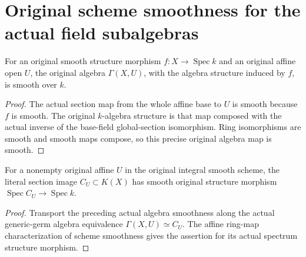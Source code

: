 \section{Original scheme smoothness for the actual field subalgebras}

\begin{theorem}\label{thm:sc0-smooth-original-affine-sections}
\leanok
For an original smooth structure morphism $f:X\to\operatorname{Spec} k$
and an original affine open $U$, the original algebra
$\Gamma(X,U)$, with the algebra structure induced by $f$, is smooth over $k$.
\end{theorem}
\begin{proof}
The actual section map from the whole affine base to $U$ is smooth
because $f$ is smooth. The original $k$-algebra structure is that
map composed with the actual inverse of the base-field global-section
isomorphism. Ring isomorphisms are smooth and smooth maps compose,
so this precise original algebra map is smooth.
\end{proof}

\begin{theorem}\label{thm:sc0-smooth-original-field-subalgebra}
\leanok
{}
For a nonempty original affine $U$ in the original integral smooth
scheme, the literal section image $C_U\subset K(X)$ has smooth
original structure morphism $\operatorname{Spec} C_U\to\operatorname{Spec} k$.
\end{theorem}
\begin{proof}
Transport the preceding actual algebra smoothness along the actual
generic-germ algebra equivalence $\Gamma(X,U)\simeq C_U$. The
affine ring-map characterization of scheme smoothness gives the
assertion for its actual spectrum structure morphism.
\end{proof}
